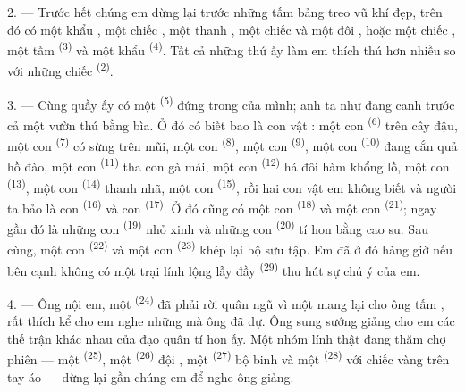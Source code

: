 2. --- Trước hết chúng em dừng lại trước những tấm bảng treo vũ khí đẹp, trên đó có một
khẩu , một chiếc , một thanh , một
chiếc  và một đôi , hoặc một chiếc , một tấm  \textsuperscript{(3)} và một khẩu 
\textsuperscript{(4)}. Tất cả những thứ ấy làm em thích thú hơn nhiều so với những chiếc
 \textsuperscript{(2)}.

\VUsaut{3.0mm}
\VUsaut{2.6mm}

3. --- Cùng quầy ấy có một  \textsuperscript{(5)} đứng trong
 của mình; anh ta như đang canh trước cả một vườn thú bằng bìa. Ở đó có
biết bao là con vật : một con  \textsuperscript{(6)} trên cây đậu, một con
 \textsuperscript{(7)} có sừng trên mũi, một con 
\textsuperscript{(8)}, một con  \textsuperscript{(9)}, một con
 \textsuperscript{(10)} đang cắn quả hồ đào, một con 
\textsuperscript{(11)} tha con gà mái, một con  \textsuperscript{(12)} há
đôi hàm khổng lồ, một con  \textsuperscript{(13)}, một con  \textsuperscript{(14)} thanh nhã, một con  \textsuperscript{(15)},
rồi hai con vật em không biết và người ta bảo là con 
\textsuperscript{(16)} và con  \textsuperscript{(17)}. Ở đó cũng có một
con  \textsuperscript{(18)} và một con 
\textsuperscript{(21)}; ngay gần đó là những con  \textsuperscript{(19)}
nhỏ xinh và những con  \textsuperscript{(20)} tí hon bằng cao su. Sau
cùng, một con  \textsuperscript{(22)} và một con 
\textsuperscript{(23)} khép lại bộ sưu tập. Em đã ở đó hàng giờ nếu bên cạnh không có
một trại lính lộng lẫy đầy  \textsuperscript{(29)} thu hút sự chú ý của
em.

\VUsaut{4.0mm}
\VUsaut{2.8mm}

4. --- Ông nội em, một  \textsuperscript{(24)} đã phải rời quân ngũ
vì một  mang lại cho ông tấm , rất thích
kể cho em nghe những  mà ông đã dự. Ông sung sướng giảng cho em các
thế trận khác nhau của đạo quân tí hon ấy. Một nhóm lính thật đang thăm chợ phiên — một
 \textsuperscript{(25)}, một 
\textsuperscript{(26)} đội , một 
\textsuperscript{(27)} bộ binh và một 
\textsuperscript{(28)} với chiếc  vàng trên tay áo — dừng lại gần chúng em để
nghe ông giảng.

